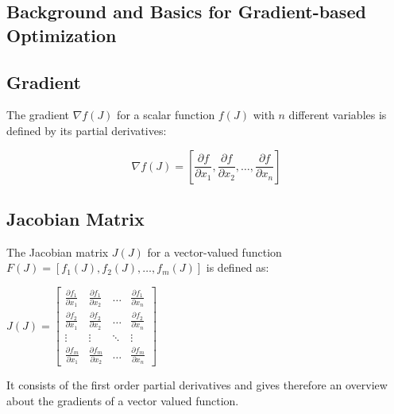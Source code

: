 \documentclass[
  letterpaper,
  DIV=11,
  numbers=noendperiod]{scrreprt}
\begin{document}
\subsection{Background and Basics for Gradient-based
Optimization}\label{background-and-basics-for-gradient-based-optimization}

\subsection{Gradient}\label{gradient}

The gradient \(\nabla f(J)\) for a scalar function \(f(J)\) with \(n\)
different variables is defined by its partial derivatives:

\[\nabla f(J) = \left[ \frac{\partial f}{\partial x_1}, \frac{\partial f}{\partial x_2}, \ldots, \frac{\partial f}{\partial x_n} \right]\]

\subsection{Jacobian Matrix}\label{jacobian-matrix}

The Jacobian matrix \(J(J)\) for a vector-valued function
\(F(J) = [f_1(J), f_2(J), \ldots, f_m(J)]\) is defined as:

\(J(J) = \begin{bmatrix} \frac{\partial f_1}{\partial x_1} & \frac{\partial f_1}{\partial x_2} & \ldots & \frac{\partial f_1}{\partial x_n} \\ \frac{\partial f_2}{\partial x_1} & \frac{\partial f_2}{\partial x_2} & \ldots & \frac{\partial f_2}{\partial x_n} \\ \vdots & \vdots & \ddots & \vdots \\ \frac{\partial f_m}{\partial x_1} & \frac{\partial f_m}{\partial x_2} & \ldots & \frac{\partial f_m}{\partial x_n} \end{bmatrix}\)

It consists of the first order partial derivatives and gives therefore
an overview about the gradients of a vector valued function.
\end{document}
